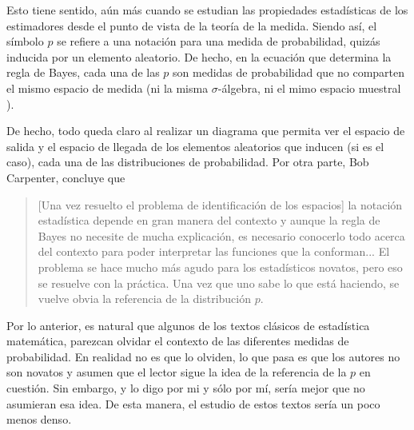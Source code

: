 Esto tiene sentido, aún más cuando se estudian las propiedades estadísticas de los estimadores desde el punto de vista de la teoría de la medida. Siendo así, el símbolo $p$ se refiere a una notación para una medida de probabilidad, quizás inducida por un elemento aleatorio. De hecho, en la ecuación que determina la regla de Bayes, cada una de las $p$ son medidas de probabilidad que no comparten el mismo espacio de medida (ni la misma $ \sigma$-álgebra, ni el mimo espacio muestral ).

De hecho, todo queda claro al realizar un diagrama que permita ver el espacio de salida y el espacio de llegada de los elementos aleatorios que inducen (si es el caso), cada una de las distribuciones de probabilidad. Por otra parte, Bob Carpenter, concluye que

\begin{quote}
[Una vez resuelto el problema de identificación de los espacios] la notación estadística depende en gran manera del contexto y aunque la regla de Bayes no necesite de mucha explicación, es necesario conocerlo todo acerca del contexto para poder interpretar las funciones que la conforman... El problema se hace mucho más agudo para los estadísticos novatos, pero eso se resuelve con la práctica. Una vez que uno sabe lo que está haciendo, se vuelve obvia la referencia de la distribución $ p$.
\end{quote}

Por lo anterior, es natural que algunos de los textos clásicos de estadística matemática, parezcan olvidar el contexto de las diferentes medidas de probabilidad. En realidad no es que lo olviden, lo que pasa es que los autores no son novatos y asumen que el lector sigue la idea de la referencia de la $ p$ en cuestión. Sin embargo, y lo digo por mi y sólo por mí, sería mejor que no asumieran esa idea. De esta manera, el estudio de estos textos sería un poco menos denso.




